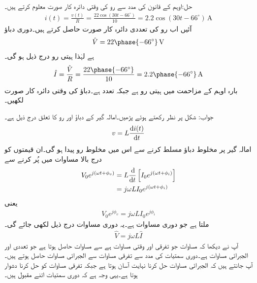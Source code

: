 حل:اوہم کے قانون کی مدد سے رو کی وقتی دائرہ کار صورت معلوم کرتے ہیں۔
\begin{align*}
i(t)=\frac{v(t)}{R}=\frac{22\cos(30t-66^{\circ})}{10}=2.2\cos(30t-66^{\circ}) \, \si{\ampere}
\end{align*}
آئیں اب رو کی تعددی دائرہ کار صورت حاصل کرتے ہیں۔دوری دباؤ
\begin{align*}
\hat{V}=22\phase{-66^{\circ}}\, \si{\volt}
\end{align*}
ہے لہٰذا ہیتی رو درج ذیل ہو گی۔
\begin{align*}
\hat{I}=\frac{\hat{V}}{R}=\frac{22\phase{-66^{\circ}}}{10}=2.2\phase{-66^{\circ}} \, \si{\ampere}
\end{align*}
بارہ اوہم کے مزاحمت میں ہیتی رو  ہے جبکہ تعدد  ہے۔دباؤ کی وقتی دائرہ کار صورت لکھیں۔

جواب:
شکل  پر نظر رکھتے ہوئے پڑھیں۔امالہ گیر کے دباؤ اور رو کا تعلق درج ذیل ہے۔
\begin{align}\label{مساوات_بدلتا_امالہ_وقتی_تعلق}
v=L\frac{\dif i(t)}{\dif t}
\end{align}
امالہ گیر پر مخلوط دباؤ  مسلط کرنے سے اس میں مخلوط رو  پیدا ہو گی۔ان قیمتوں کو درج بالا مساوات میں پُر کرنے سے
\begin{align*}
V_0 e^{j(\omega t+\phi_v)}&=L \frac{\dif}{\dif t} \left[I_0 e^{j(\omega t +\phi_i)}\right]\\
&=j \omega L I_0 e^{j(\omega t+\phi_i)}
\end{align*}
یعنی
\begin{align*}
V_0 e^{j\phi_v}=j\omega L I_0 e^{j\phi_i}
\end{align*}
ملتا ہے جو دوری مساوات ہے۔یہ دوری مساوات درج ذیل لکھی جائے گی۔
\begin{align}\label{مساوات_بدلتا_امالہ_تعددی_تعلق_الف}
\hat{V}=j\omega L \hat{I}
\end{align} 
آپ نے دیکھا کہ مساوات  جو تفرقی اور وقتی مساوات ہے سے مساوات  حاصل ہوتا ہے جو تعددی اور الجبرائی مساوات ہے۔دوری سمتیات کی مدد سے تفرقی مساوات سے الجبرائی مساوات حاصل ہوتے ہیں۔آپ جانتے ہیں کہ الجبرائی مساوات حل کرنا نہایت آسان ہوتا ہے جبکہ تفرقی مساوات کو حل کرنا دشوار ہوتا ہے۔یہی وجہ ہے کہ دوری سمتیات اتنے مقبول ہیں۔

